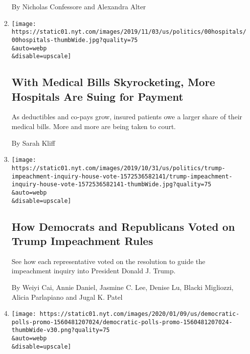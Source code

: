 \begin{enumerate}
  By Nicholas Confessore and Alexandra Alter
\item
  \href{/2019/11/08/us/hospitals-lawsuits-medical-debt.html}{}

  \texttt{[image: https://static01.nyt.com/images/2019/11/03/us/politics/00hospitals/00hospitals-thumbWide.jpg?quality=75\\\&auto=webp\\\&disable=upscale]}

  \hypertarget{with-medical-bills-skyrocketing-more-hospitals-are-suing-for-payment}{%
  \subsection{With Medical Bills Skyrocketing, More Hospitals Are Suing
  for
  Payment}\label{with-medical-bills-skyrocketing-more-hospitals-are-suing-for-payment}}

  As deductibles and co-pays grow, insured patients owe a larger share
  of their medical bills. More and more are being taken to court.

  By Sarah Kliff
\item
  \href{/interactive/2019/10/31/us/politics/trump-impeachment-inquiry-house-vote.html}{}

  \texttt{[image: https://static01.nyt.com/images/2019/10/31/us/politics/trump-impeachment-inquiry-house-vote-1572536582141/trump-impeachment-inquiry-house-vote-1572536582141-thumbWide.jpg?quality=75\\\&auto=webp\\\&disable=upscale]}

  \hypertarget{how-democrats-and-republicans-voted-on-trump-impeachment-rules}{%
  \subsection{How Democrats and Republicans Voted on Trump Impeachment
  Rules}\label{how-democrats-and-republicans-voted-on-trump-impeachment-rules}}

  See how each representative voted on the resolution to guide the
  impeachment inquiry into President Donald J. Trump.

  By Weiyi Cai, Annie Daniel, Jasmine C. Lee, Denise Lu, Blacki
  Migliozzi, Alicia Parlapiano and Jugal K. Patel
\item
  \href{/interactive/2020/us/elections/democratic-polls.html}{}

  \texttt{[image: https://static01.nyt.com/images/2020/01/09/us/democratic-polls-promo-1560481207024/democratic-polls-promo-1560481207024-thumbWide-v30.png?quality=75\\\&auto=webp\\\&disable=upscale]}

  \hypertarget{which-democrats-are-leading-the-2020-presidential-race}{%
}
\end{enumerate}
